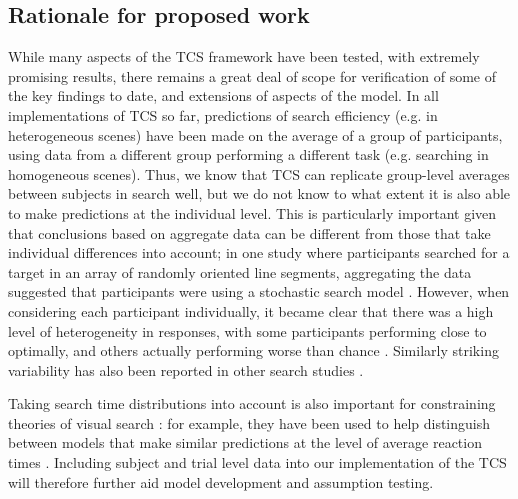 \documentclass[preprint,12pt,authoryear]{elsarticle}
\begin{document}
\subsection{Rationale for proposed work}

While many aspects of the TCS framework have been tested, with extremely promising results, there remains a great deal of scope for verification of some of the key findings to date, and extensions of aspects of the model. In all implementations of TCS so far, predictions of search efficiency (e.g. in heterogeneous scenes) have been made on the average of a group of participants, using data from a different group performing a different task (e.g. searching in homogeneous scenes). Thus, we know that TCS can replicate group-level averages between subjects in search well, but we do not know to what extent it is also able to make predictions at the individual level. This is particularly important given that conclusions based on aggregate data can be different from those that take individual differences into account; in one study where participants searched for a target in an array of randomly oriented line segments, aggregating the data suggested that participants were using a stochastic search model \citep{nowakowska2017human}. However, when considering each participant individually, it became clear that there was a high level of heterogeneity in responses, with some participants performing close to optimally, and others actually performing worse than chance \citep{nowakowska2017human}. Similarly striking variability has also been reported in other search studies \citep{irons2016choosing, irons2018characterizing, clarke2022stable}. 

Taking search time distributions into account is also important for constraining theories of visual search \citep{wolfe2010reaction, liesefeld2020theoretical}: for example, they have been used to help distinguish between models that make similar predictions at the level of average reaction times \citep{moran2016serial, moran2017appeal}. Including subject and trial level data into our implementation of the TCS will therefore further aid model development and assumption testing.
\end{document}
